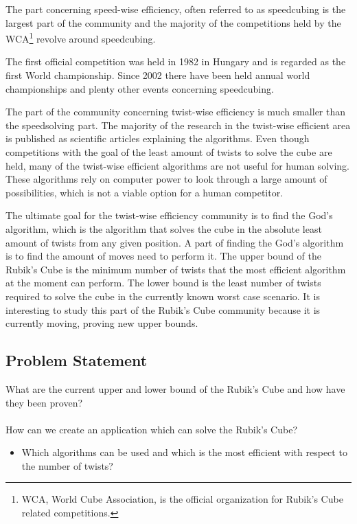 \documentclass{article}
\begin{document}
The part concerning speed-wise efficiency, often referred to as speedcubing is the largest part of the community and the majority of the competitions held by the WCA\footnote{WCA, World Cube Association, is the official organization for Rubik's Cube related competitions.} revolve around speedcubing.

The first official competition was held in 1982 in Hungary and is regarded as the first World championship. Since 2002 there have been held annual world championships and plenty other events concerning speedcubing. 

The part of the community concerning twist-wise efficiency is much smaller than the speedsolving part. The majority of the research in the twist-wise efficient area is published as scientific articles explaining the algorithms. Even though competitions with the goal of the least amount of twists to solve the cube are held, many of the twist-wise efficient algorithms are not useful for human solving. These algorithms rely on computer power to look through a large amount of possibilities, which is not a viable option for a human competitor.

The ultimate goal for the twist-wise efficiency community is to find the God's algorithm, which is the algorithm that solves the cube in the absolute least amount of twists from any given position. A part of finding the God's algorithm is to find the amount of moves need to perform it. The upper bound of the Rubik's Cube is the minimum number of twists that the most efficient algorithm at the moment can perform. The lower bound is the least number of twists required to solve the cube in the currently known worst case scenario. It is interesting to study this part of the Rubik's Cube community because it is currently moving, proving new upper bounds.

\subsection{Problem Statement}
What are the current upper and lower bound of the Rubik's Cube and how have they been proven? \\
\\
How can we create an application which can solve the Rubik's Cube?
\begin{itemize}
	\item Which algorithms can be used and which is the most efficient with respect to the number of twists?
\end{itemize}
\end{document}
